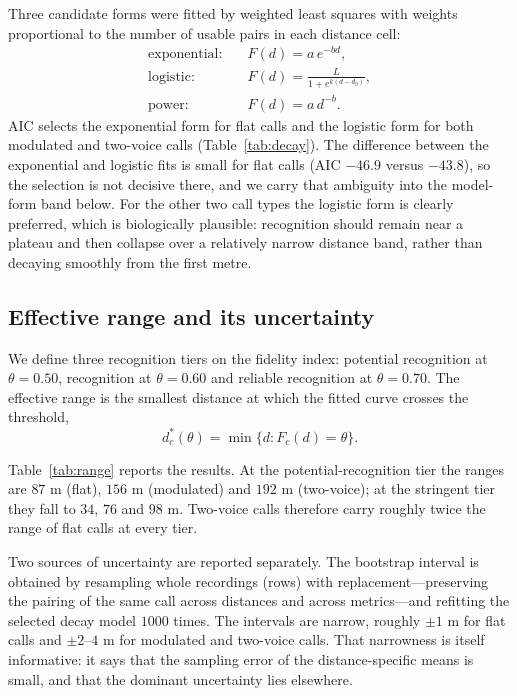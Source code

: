 \documentclass{apmcmthesis}
\begin{document}
Three candidate forms were fitted by weighted least squares with weights proportional to
the number of usable pairs in each distance cell:
\begin{align}
\text{exponential:}\quad & F(d)=a\,e^{-bd},\\
\text{logistic:}\quad & F(d)=\frac{L}{1+e^{k(d-d_0)}},\\
\text{power:}\quad & F(d)=a\,d^{-b}.
\end{align}
AIC selects\cite{burnham} the exponential form for flat calls and the logistic form for both modulated
and two-voice calls (Table~\ref{tab:decay}). The difference between the exponential and
logistic fits is small for flat calls (AIC $-46.9$ versus $-43.8$), so the selection is
not decisive there, and we carry that ambiguity into the model-form band below. For the
other two call types the logistic form is clearly preferred, which is biologically
plausible: recognition should remain near a plateau and then collapse over a relatively
narrow distance band, rather than decaying smoothly from the first metre.



\subsection{Effective range and its uncertainty}

We define three recognition tiers on the fidelity index: potential recognition at
$\theta=0.50$, recognition at $\theta=0.60$ and reliable recognition at
$\theta=0.70$. The effective range is the smallest distance at which the fitted curve
crosses the threshold,
\begin{equation}
d^{*}_{c}(\theta)=\min\{d: F_c(d)=\theta\}.
\label{eq:radius}
\end{equation}

Table~\ref{tab:range} reports the results. At the potential-recognition tier the ranges
are $87$ m (flat), $156$ m (modulated) and $192$ m (two-voice); at the stringent tier
they fall to $34$, $76$ and $98$ m. Two-voice calls therefore carry roughly twice the
range of flat calls at every tier.



Two sources of uncertainty are reported separately. The bootstrap interval is obtained by
resampling whole recordings (rows) with replacement---preserving the pairing of the same
call across distances and across metrics---and refitting the selected decay model $1000$
times. The intervals are narrow, roughly $\pm1$ m for flat calls and $\pm2$--$4$ m for
modulated and two-voice calls. That narrowness is itself informative: it says that the
sampling error of the distance-specific means is small, and that the dominant uncertainty
lies elsewhere.
\end{document}
